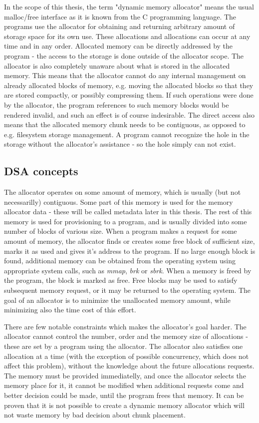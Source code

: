 In the scope of this thesis, the term "dynamic memory allocator" means the usual malloc/free interface as it is known from the C programming language. The programs use the allocator for obtaining and returning arbitrary amount of storage space for its own use. These allocations and allocations can occur at any time and in any order. Allocated memory can be directly addressed by the program - the access to the storage is done outside of the allocator scope. The allocator is also completely unaware about what is stored in the allocated memory. This means that the allocator cannot do any internal management on already allocated blocks of memory, e.g. moving the allocated blocks so that they are stored compactly, or possibly compressing them. If such operations were done by the allocator, the program references to such memory blocks would be rendered invalid, and such an effect is of course indesirable. The direct access also means that the allocated memory chunk needs to be contiguous, as opposed to e.g. filesystem storage management. A program cannot recognize the hole in the storage without the allocator's assistance - so the hole simply can not exist.

\subsection{DSA concepts}

The allocator operates on some amount of memory, which is usually (but not necessarilly) contiguous. Some part of this memory is used for the memory allocator data - these will be called metadata later in this thesis. The rest of this memory is used for provisioning to a program, and is usually divided into some number of blocks of various size. When a program makes a request for some amount of memory, the allocator finds or creates some free block of sufficient size, marks it as used and gives it's address to the program. If no large enough block is found, additional memory can be obtained from the operating system using appropriate system calls, such as {\em mmap}, {\em brk} or {\em sbrk}.\cite{sbrk-manpage, mmap-manpage} When a memory is freed by the program, the block is marked as free. Free blocks may be used to satisfy subsequent memory request, or it may be returned to the operating system. The goal of an allocator is to minimize the unallocated memory amount, while minimizing also the time cost of this effort.

There are few notable constraints which makes the allocator's goal harder. The allocator cannot control the number, order and the memory size of allocations - these are set by a program using the allocator. The allocator also satisfies one allocation at a time (with the exception of possible concurrency, which does not affect this problem), without the knowledge about the future allocations requests. The memory must be provided immediatelly, and once the allocator selects the memory place for it, it cannot be modified when additional requests come and better decision could be made, until the program frees that memory. It can be proven that it is not possible to create a dynamic memory allocator which will not waste memory by bad decision about chunk placement.\cite{DSAsurvey}

